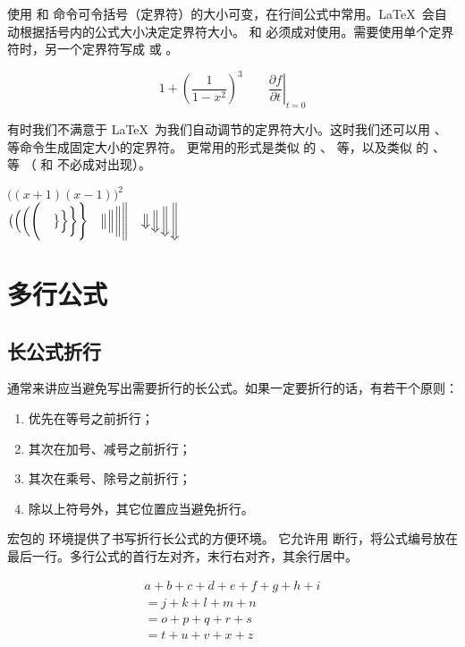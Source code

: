 使用  和  命令可令括号（定界符）的大小可变，在行间公式中常用。\LaTeX\ 会自动根据括号内的公式大小决定定界符大小。
 和  必须成对使用。需要使用单个定界符时，另一个定界符写成  或 。
\begin{example}
\[1 + \left(\frac{1}{1-x^{2}}
\right)^3 \qquad
\left.\frac{\partial f}{\partial t}
\right|_{t=0}\]
\end{example}

有时我们不满意于 \LaTeX\ 为我们自动调节的定界符大小。这时我们还可以用 、 等命令生成固定大小的定界符。
更常用的形式是类似  的 、 等，以及类似  的 、 等
（ 和  不必成对出现）。
\begin{example}
$\Big((x+1)(x-1)\Big)^{2}$\\
$\bigl( \Bigl( \biggl( \Biggl( 
\quad
\bigr\} \Bigr\} \biggr\} \Biggr\} 
\quad
\big\| \Big\| \bigg\| \Bigg\| 
\quad
\big\Downarrow \Big\Downarrow
\bigg\Downarrow \Bigg\Downarrow$
\end{example}

\section{多行公式}

\subsection{长公式折行}

通常来讲应当避免写出需要折行的长公式。如果一定要折行的话，有若干个原则：
\begin{enumerate}
  \item 优先在等号之前折行；
  \item 其次在加号、减号之前折行；
  \item 其次在乘号、除号之前折行；
  \item 除以上符号外，其它位置应当避免折行。
\end{enumerate}

 宏包的  环境提供了书写折行长公式的方便环境。
它允许用  断行，将公式编号放在最后一行。多行公式的首行左对齐，末行右对齐，其余行居中。
\begin{example}
\begin{multline}
a + b + c + d + e + f
+ g + h + i \\
= j + k + l + m + n\\
= o + p + q + r + s\\
= t + u + v + x + z
\end{multline}
\end{example}

